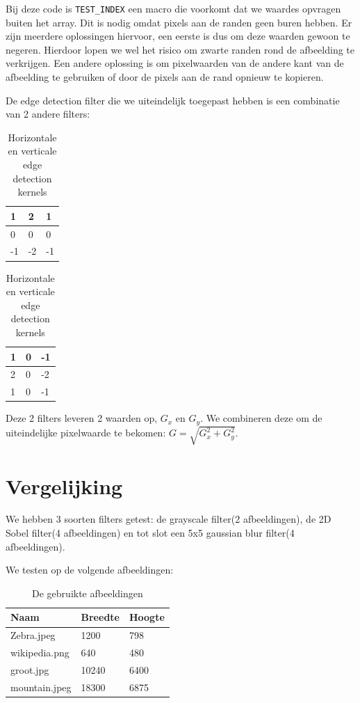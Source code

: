 \documentclass[10pt, twocolumn, a4paper]{article}
\begin{document}
Bij deze code is \texttt{TEST_INDEX} een macro die voorkomt dat we waardes opvragen buiten het array. Dit is nodig omdat pixels aan de randen geen buren hebben. Er zijn meerdere oplossingen hiervoor, een eerste is dus om deze waarden gewoon te negeren. Hierdoor lopen we wel het risico om zwarte randen rond de afbeelding te verkrijgen. Een andere oplossing is om pixelwaarden van de andere kant van de afbeelding te gebruiken of door de pixels aan de rand opnieuw te kopieren. 

De edge detection filter die we uiteindelijk toegepast hebben is een combinatie van 2 andere filters:

\begin{table}[H]
    \centering
    \begin{tabular}{|l|l|l|}
        \hline
        1 & 2 & 1 \\ \hline
        0 & 0 & 0 \\ \hline
        -1 & -2 & -1 \\
        \hline
    \end{tabular}
    \begin{tabular}{|l|l|l|}
        \hline
        1 & 0 & -1 \\ \hline
        2 & 0 & -2 \\ \hline
        1 & 0 & -1 \\
        \hline
    \end{tabular}
    \caption{Horizontale en verticale edge detection kernels}
\end{table}

Deze 2 filters leveren 2 waarden op, $G_x$ en $G_y$. We combineren deze om de uiteindelijke pixelwaarde te bekomen: $G = \sqrt{G_x^2 + G_y^2 }$. 

\section{Vergelijking}

We hebben 3 soorten filters getest: de grayscale filter(2 afbeeldingen), de 2D Sobel filter(4 afbeeldingen) en tot slot een 5x5 gaussian blur filter(4 afbeeldingen). 

We testen op de volgende afbeeldingen:
\begin{table}[H]
    \centering
    \begin{tabular}{|l|l|l|}
    \hline
    \textbf{Naam} & \textbf{Breedte} & \textbf{Hoogte} \\ \hline
    Zebra.jpeg    & 1200             & 798             \\ \hline
    wikipedia.png & 640              & 480             \\ \hline
    groot.jpg     & 10240            & 6400            \\ \hline
    mountain.jpeg & 18300            & 6875            \\ \hline
    \end{tabular}
    \caption{De gebruikte afbeeldingen}
\end{table}
\end{document}
